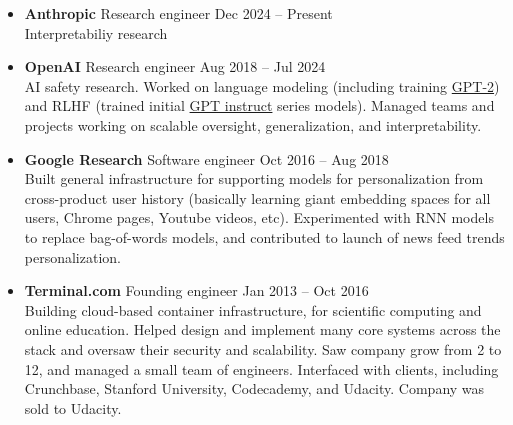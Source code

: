 \documentclass[11 pt]{article}
\begin{document}
\begin{itemize}

\item \textbf{Anthropic} Research engineer \hfill Dec 2024 -- Present \\
  Interpretabiliy research

\item \textbf{OpenAI} Research engineer \hfill Aug 2018 -- Jul 2024 \\
  AI safety research.  Worked on language modeling (including training \href{https://openai.com/blog/better-language-models/}{GPT-2}) and RLHF (trained initial \href{https://openai.com/blog/instruction-following/}{GPT instruct} series models).  Managed teams and projects working on scalable oversight, generalization, and interpretability.


\item \textbf{Google Research} Software engineer \hfill Oct 2016 -- Aug 2018 \\
Built general infrastructure
for supporting models for personalization from cross-product user history (basically learning giant embedding spaces for all users, Chrome pages, Youtube videos, etc).
Experimented with RNN models to replace bag-of-words models, and contributed to launch of news feed trends personalization.

\item \textbf{Terminal.com} Founding engineer \hfill Jan 2013 -- Oct 2016 \\
Building cloud-based container infrastructure, for scientific computing and online education.
Helped design and implement many core systems across the stack %
and oversaw their security and scalability.
Saw company grow from 2 to 12, and managed a small team of engineers.
Interfaced with clients, including Crunchbase, Stanford University, Codecademy, and Udacity.
Company was sold to Udacity.


\end{itemize}
\end{document}
